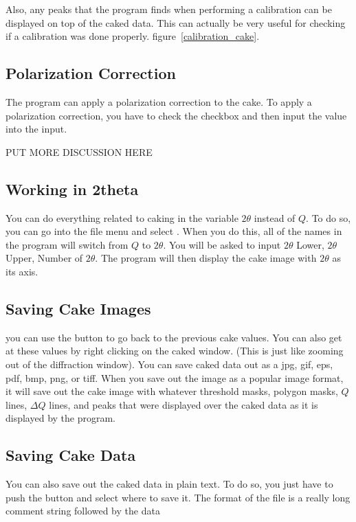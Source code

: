 Also, any peaks that the program finds when performing
a calibration can be displayed on top of the caked
data. This can actually be very useful for checking if
a calibration was done properly.
figure~\ref{calibration_cake}. 

\subsection{Polarization Correction}
The program can apply a polarization correction to the
cake. To apply a polarization correction, you have
to check the  checkbox
and then input the value into the  input.

PUT MORE DISCUSSION HERE

\subsection{Working in 2theta}

You can do everything related to caking in the variable
$2\theta$ instead of $Q$. To do so, you can go into
the file menu and select . When you 
do this, all of the names in the program will switch 
from $Q$ to $2\theta$. You will be asked to input 
$2\theta$ Lower, $2\theta$ Upper, Number of $2\theta$. 
The program will then display the cake image with
$2\theta$ as its axis.

\subsection{Saving Cake Images}

you can use the  button to go back to the
previous cake values. You can also get at these values by 
right clicking on the caked window. (This is just like
zooming out of the diffraction window). You can save caked
data out as a jpg, gif, eps, pdf, bmp, png, or tiff.
When you save out the image as a popular image format, it
will save out the cake image with whatever threshold masks,
polygon masks, $Q$ lines, $\Delta Q$ lines, and peaks that
were displayed over the caked data as it is displayed by
the program.

\subsection{Saving Cake Data}

You can also save out the caked data in plain text. To do so,
you just have to push the  button and
select where to save it. The format of the file is a really
long comment string followed by the data 

